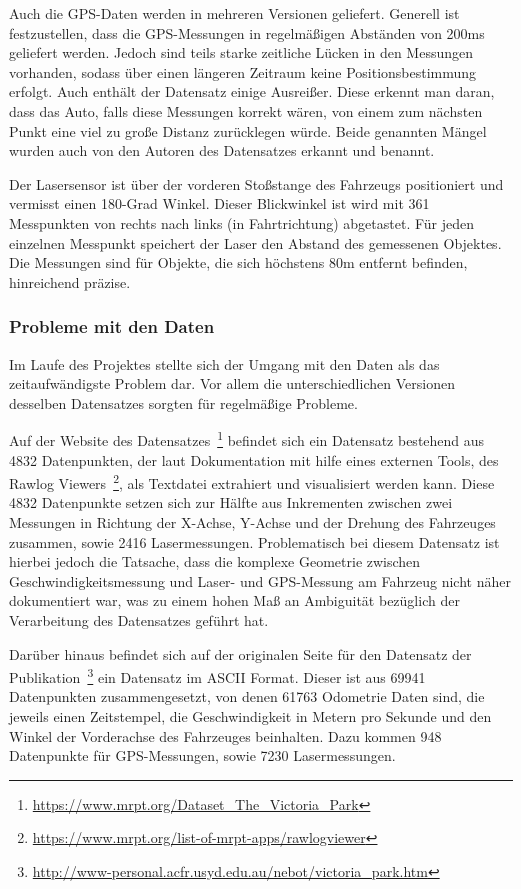 \documentclass[11pt]{article}
\begin{document}
Auch die GPS-Daten werden in mehreren Versionen geliefert. Generell ist festzustellen, dass die GPS-Messungen in regelmäßigen Abständen von 200ms geliefert werden. Jedoch sind teils starke zeitliche Lücken in den Messungen vorhanden, sodass über einen längeren Zeitraum keine Positionsbestimmung erfolgt. Auch enthält der Datensatz einige Ausreißer. Diese erkennt man daran, dass das Auto, falls diese Messungen korrekt wären, von einem zum nächsten Punkt eine viel zu große Distanz zurücklegen würde. Beide genannten Mängel wurden auch von den Autoren des Datensatzes erkannt und benannt.

Der Lasersensor ist über der vorderen Stoßstange des Fahrzeugs positioniert und vermisst einen 180-Grad Winkel. Dieser Blickwinkel ist wird mit 361 Messpunkten von rechts nach links (in Fahrtrichtung) abgetastet. Für jeden einzelnen Messpunkt speichert der Laser den Abstand des gemessenen Objektes. Die Messungen sind für Objekte, die sich höchstens 80m entfernt befinden, hinreichend präzise. 

\subsubsection{Probleme mit den Daten}
Im Laufe des Projektes stellte sich der Umgang mit den Daten als das zeitaufwändigste Problem dar. Vor allem die unterschiedlichen Versionen desselben Datensatzes sorgten für regelmäßige Probleme.

Auf der Website des Datensatzes~\footnote{\url{https://www.mrpt.org/Dataset_The_Victoria_Park}} befindet sich ein Datensatz bestehend aus 4832 Datenpunkten, der laut Dokumentation mit hilfe eines externen Tools, des Rawlog Viewers~\footnote{\url{https://www.mrpt.org/list-of-mrpt-apps/rawlogviewer}}, als Textdatei extrahiert und visualisiert werden kann. Diese 4832 Datenpunkte setzen sich zur Hälfte aus Inkrementen zwischen zwei Messungen in Richtung der X-Achse, Y-Achse und der Drehung des Fahrzeuges zusammen, sowie 2416 Lasermessungen. Problematisch bei diesem Datensatz ist hierbei jedoch die Tatsache, dass die komplexe Geometrie zwischen Geschwindigkeitsmessung und Laser- und GPS-Messung am Fahrzeug nicht näher dokumentiert war, was zu einem hohen Maß an Ambiguität bezüglich der Verarbeitung des Datensatzes geführt hat. 

Darüber hinaus befindet sich auf der originalen Seite für den Datensatz der Publikation~\footnote{\url{http://www-personal.acfr.usyd.edu.au/nebot/victoria_park.htm}} ein Datensatz im ASCII Format. Dieser ist aus 69941 Datenpunkten zusammengesetzt, von denen 61763 Odometrie Daten sind, die jeweils einen Zeitstempel, die Geschwindigkeit in Metern pro Sekunde und den Winkel der Vorderachse des Fahrzeuges beinhalten. Dazu kommen 948 Datenpunkte für GPS-Messungen, sowie 7230 Lasermessungen.
\end{document}
